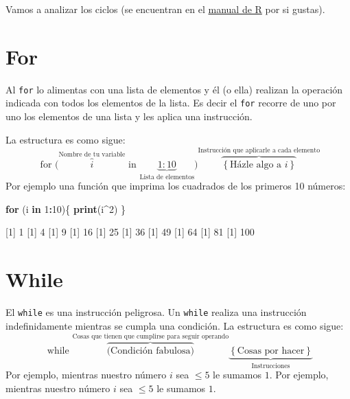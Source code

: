 \documentclass[
]{book}
\newenvironment{Shaded}{\begin{snugshade}}{\end{snugshade}}
\newcommand{\ControlFlowTok}[1]{\textcolor[rgb]{0.13,0.29,0.53}{\textbf{#1}}}
\newcommand{\DecValTok}[1]{\textcolor[rgb]{0.00,0.00,0.81}{#1}}
\newcommand{\KeywordTok}[1]{\textcolor[rgb]{0.13,0.29,0.53}{\textbf{#1}}}
\newcommand{\NormalTok}[1]{#1}
\newcommand{\OperatorTok}[1]{\textcolor[rgb]{0.81,0.36,0.00}{\textbf{#1}}}
\begin{document}
Vamos a analizar los ciclos (se encuentran en el \href{http://cran.r-project.org/doc/manuals/R-lang.html\#Looping}{manual de R} por si gustas).

\hypertarget{for}{%
\section{For}\label{for}}

Al \texttt{for} lo alimentas con una lista de elementos y él (o ella) realizan la operación indicada con todos los elementos de la lista. Es decir el \texttt{for} recorre de uno por uno los elementos de una lista y les aplica una instrucción.

La estructura es como sigue:
\[
\begin{equation}
\textrm{ for } \Big( \overbrace{i}^\text{Nombre de tu variable} \textrm{ in } \underbrace{1:10}_\text{Lista de elementos}\Big)  \overbrace{ \left \{\textrm{Házle algo a $i$} \right \} }^\text{Instrucción que aplicarle a cada elemento} 
\end{equation}
\]
Por ejemplo una función que imprima los cuadrados de los primeros 10 números:

\begin{Shaded}
\begin{Highlighting}[]
\ControlFlowTok{for}\NormalTok{ (i }\ControlFlowTok{in} \DecValTok{1}\OperatorTok{:}\DecValTok{10}\NormalTok{)\{}
\KeywordTok{print}\NormalTok{(i}\OperatorTok{^}\DecValTok{2}\NormalTok{)}
\NormalTok{\}}
\end{Highlighting}
\end{Shaded}

{[}1{]} 1
{[}1{]} 4
{[}1{]} 9
{[}1{]} 16
{[}1{]} 25
{[}1{]} 36
{[}1{]} 49
{[}1{]} 64
{[}1{]} 81
{[}1{]} 100

\hypertarget{while}{%
\section{While}\label{while}}

El \texttt{while} es una instrucción peligrosa. Un \texttt{while} realiza una instrucción indefinidamente mientras se cumpla una condición. La estructura es como sigue:
\[
\begin{equation}
\textrm{ while } \overbrace{\Big( \textrm{Condición fabulosa} \Big)}^\text{Cosas que tienen que cumplirse para seguir operando} \underbrace{ \left \{ \textrm{Cosas por hacer} \right \}}_\text{Instrucciones}
\end{equation}
\]
Por ejemplo, mientras nuestro número \(i\) sea \(\leq 5\) le sumamos \(1\).
Por ejemplo, mientras nuestro número \(i\) sea \(\leq 5\) le sumamos \(1\).
\end{document}
